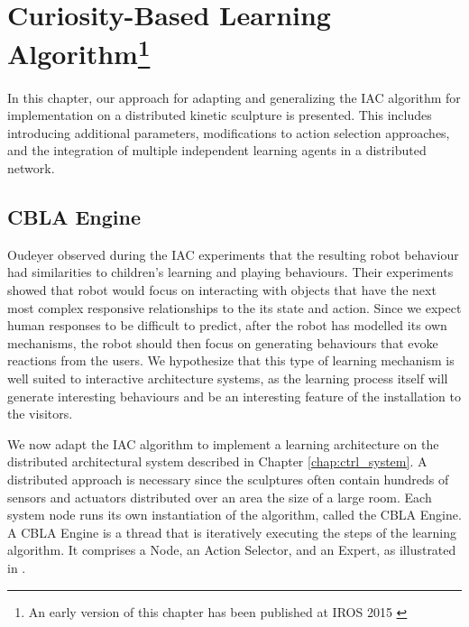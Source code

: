 \chapter[Curiosity-Based Learning Algorithm]
{Curiosity-Based Learning Algorithm\footnote{An early version of this chapter has been published at IROS 2015 \cite{Chan2015} }} 
\label{chap:cbla}
 
In this chapter, our approach for adapting and generalizing the IAC algorithm for implementation on a distributed kinetic sculpture is presented. This includes introducing additional parameters, modifications to action selection approaches, and the integration of multiple independent learning agents in a distributed network. 


\section{CBLA Engine}

Oudeyer \cite{Oudeyer2005} observed during the IAC experiments that the resulting robot behaviour had similarities to children's learning and playing behaviours. Their experiments showed that robot would focus on interacting with objects that have the next most complex responsive relationships to the its state and action. Since we expect human responses to be difficult to predict, after the robot has modelled its own mechanisms, the robot should then focus on generating behaviours that evoke reactions from the users. We hypothesize that this type of learning mechanism is well suited to interactive architecture systems, as the learning process itself will generate interesting behaviours and be an interesting feature of the installation to the visitors. 

We now adapt the IAC algorithm \cite{Oudeyer2007} to implement a learning architecture on the distributed architectural system described in Chapter \ref{chap:ctrl_system}. A distributed approach is necessary since the sculptures often contain hundreds of sensors and actuators distributed over an area the size of a large room. Each system node runs its own instantiation of the algorithm, called the CBLA Engine. A CBLA Engine is a thread that is iteratively executing the steps of the learning algorithm. It comprises a Node, an Action Selector, and an Expert, as illustrated in .

